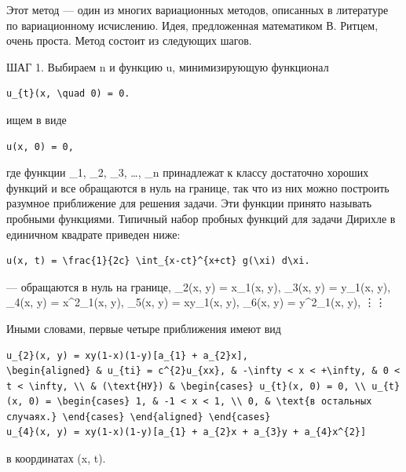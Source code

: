 \documentclass[
  ukrainian,
]{article}
\begin{document}
Этот метод --- один из многих вариационных методов, описанных в
литературе по вариационному исчислению. Идея, предложенная математиком
В. Ритцем, очень проста. Метод состоит из следующих шагов.

ШАГ 1. Выбираем n и функцию u, минимизирующую функционал

\begin{verbatim}
u_{t}(x, \quad 0) = 0.
\end{verbatim}

ищем в виде

\begin{verbatim}
u(x, 0) = 0,
\end{verbatim}

где функции \phi\_1, \phi\_2, \phi\_3, \ldots, \phi\_n принадлежат к
классу достаточно хороших функций и все обращаются в нуль на границе,
так что из них можно построить разумное приближение для решения задачи.
Эти функции принято называть пробными функциями. Типичный набор пробных
функций для задачи Дирихле в единичном квадрате приведен ниже:

\begin{verbatim}
u(x, t) = \frac{1}{2c} \int_{x-ct}^{x+ct} g(\xi) d\xi.
\end{verbatim}

--- обращаются в нуль на границе, \varphi\_2(x, y) = x\varphi\_1(x, y),
\varphi\_3(x, y) = y\varphi\_1(x, y), \varphi\_4(x, y) =
x\^{}2\varphi\_1(x, y), \varphi\_5(x, y) = xy\varphi\_1(x, y),
\varphi\_6(x, y) = y\^{}2\varphi\_1(x, y), \vdots     \vdots

Иными словами, первые четыре приближения имеют вид

\begin{verbatim}
u_{2}(x, y) = xy(1-x)(1-y)[a_{1} + a_{2}x],
\begin{aligned} & u_{ti} = c^{2}u_{xx}, & -\infty < x < +\infty, & 0 < t < \infty, \\ & (\text{НУ}) & \begin{cases} u_{t}(x, 0) = 0, \\ u_{t}(x, 0) = \begin{cases} 1, & -1 < x < 1, \\ 0, & \text{в остальных случаях.} \end{cases} \end{aligned} \end{cases}
u_{4}(x, y) = xy(1-x)(1-y)[a_{1} + a_{2}x + a_{3}y + a_{4}x^{2}]
\end{verbatim}

в координатах (x, t).
\end{document}
